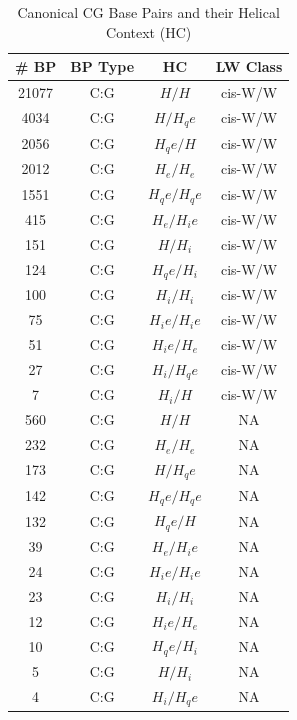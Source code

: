        
\begin{center}
\begin{longtable}{c|c|c|c}
\caption{Canonical CG Base Pairs and their Helical Context (HC)}
\label{tab:WC_CG_hel_LW}\\
\hline
\bf{\# BP} & \bf{BP Type} & \bf{HC} & \bf{LW
Class} \\ \hline \hline
  21077 & C:G & $H/H      $ & cis-W/W        \\ \hline
   4034 & C:G & $H/H_qe   $ & cis-W/W     \\ \hline
   2056 & C:G & $H_qe/H   $ & cis-W/W     \\ \hline
   2012 & C:G & $H_e/H_e  $ & cis-W/W    \\ \hline
   1551 & C:G & $H_qe/H_qe$ & cis-W/W  \\ \hline
    415 & C:G & $H_e/H_ie $ & cis-W/W   \\ \hline
    151 & C:G & $H/H_i    $ & cis-W/W      \\ \hline
    124 & C:G & $H_qe/H_i $ & cis-W/W   \\ \hline
    100 & C:G & $H_i/H_i  $ & cis-W/W    \\ \hline 
     75 & C:G & $H_ie/H_ie$ & cis-W/W  \\ \hline
     51 & C:G & $H_ie/H_e $ & cis-W/W   \\ \hline
     27 & C:G & $H_i/H_qe $ & cis-W/W   \\ \hline
      7 & C:G & $H_i/H    $ & cis-W/W      \\ \hline
    560 & C:G & $H/H      $ & NA             \\ \hline
    232 & C:G & $H_e/H_e  $ & NA         \\ \hline
    173 & C:G & $H/H_qe   $ & NA          \\ \hline
    142 & C:G & $H_qe/H_qe$ & NA       \\ \hline
    132 & C:G & $H_qe/H   $ & NA          \\ \hline
     39 & C:G & $H_e/H_ie $ & NA        \\ \hline
     24 & C:G & $H_ie/H_ie$ & NA       \\ \hline
     23 & C:G & $H_i/H_i  $ & NA         \\ \hline
     12 & C:G & $H_ie/H_e $ & NA        \\ \hline
     10 & C:G & $H_qe/H_i $ & NA        \\ \hline
      5 & C:G & $H/H_i    $ & NA           \\ \hline
      4 & C:G & $H_i/H_qe $ & NA        \\ \hline
\end{longtable}
\end{center}
       
